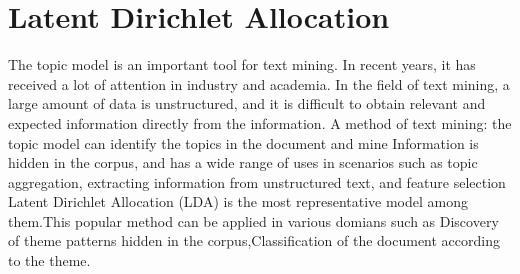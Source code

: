 \chapter{Latent Dirichlet Allocation}\label{cha}


The topic model is an important tool for text mining. In recent years, it has received a lot of attention in industry and academia. In the field of text mining, a large amount of data is unstructured, and it is difficult to obtain relevant and expected information directly from the information. A method of text mining: the topic model  can identify the topics in the document and mine Information is hidden in the corpus, and has a wide range of uses in scenarios such as topic aggregation, extracting information from unstructured text, and feature selection
Latent Dirichlet Allocation (LDA) \cite{origin}is the most representative model among them.This popular method can be applied in various domians such as Discovery of theme patterns hidden in the corpus,Classification of  the document according to the theme.
